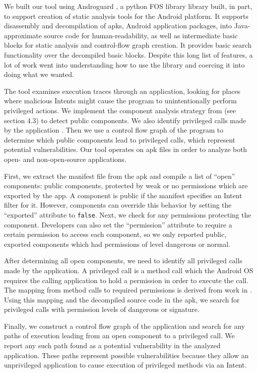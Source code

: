 \documentclass[12pt,a4paper]{article}
\begin{document}
We built our tool using Androguard \cite{androguard}, a python FOS library
library built, in part, to support creation of static analysis tools for the
Android platform. It supports disassembly and decompilation of apks, Android
application packages, into Java-approximate source code for human-readability,
as well as intermediate basic blocks for static analysis and control-flow graph
creation. It provides basic search functionality over the decompiled basic
blocks. Despite this long list of features, a lot of work went into
understanding how to use the library and coercing it into doing what we wanted.

The tool examines execution traces through an application, looking for places
where malicious Intents might cause the program to unintentionally perform
privileged actions. We implement the component analysis strategy from
\cite{chin_analyzing_2011} (see section 4.3) to detect public components. We
also identify privileged calls made by the application
\cite{felt_android_2011}. Then we use a control flow graph of the program to
determine which public components lead to privileged calls, which represent
potential vulnerabilities. Our tool operates on apk files in order to analyze
both open- and non-open-source applications.

First, we extract the manifest file from the apk and compile a list of ``open''
components: public components, protected by weak or no permissions which are
exported by the app. A component is public if the manifest specifies an Intent
filter for it. However, components can override this behavior by setting the
``exported'' attribute to \texttt{false}. Next, we check for any permissions
protecting the component. Developers can also set the ``permission'' attribute
to require a certain permission to access each component, so we only reported
public, exported components which had permissions of level dangerous or normal.

After determining all open components, we need to identify all privileged calls
made by the application. A privileged call is a method call which the Android OS
requires the calling application to hold a permission in order to execute
the call. The mapping from method calls to required permissions is
derived from work in \cite{felt_android_2011}. Using this mapping and the
decompiled source code in the apk, we search for privileged calls with
permission levels of dangerous or signature.

Finally, we construct a control flow graph of the application and search for any
paths of execution leading from an open component to a privileged call. We
report any such path found as a potential vulnerability in the analyzed
application. These paths represent possible vulnerabilities because they allow
an unprivileged application to cause execution of privileged methods via an
Intent.
\end{document}
